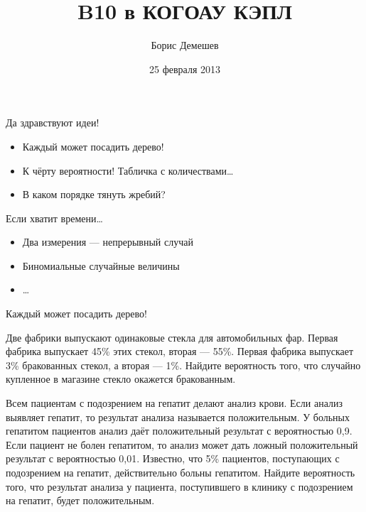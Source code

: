 \documentclass[pdftex,unicode]{beamer}
\title{B10 в КОГОАУ КЭПЛ}
\author[\href{mailto:boris.demeshev@gmail.com}{boris.demeshev@gmail.com}]{Борис Демешев}
\date{25 февраля 2013}
\institute{НИУ ВШЭ}
\begin{document}
\begin{frame}[plain]
\maketitle %
\end{frame}


\begin{frame}{} %

\begin{block}{Да здравствуют идеи!}

\begin{itemize}
\item Каждый может посадить дерево!
\item К чёрту вероятности! Табличка с количествами\ldots
\item В каком порядке тянуть жребий?
\end{itemize}

\end{block}

\begin{block}{Если хватит времени\ldots}
\begin{itemize}
\item Два измерения --- непрерывный случай
\item Биномиальные случайные величины
\item \ldots
\end{itemize}
\end{block}

\end{frame}




\begin{frame}{Каждый может посадить дерево!}

\begin{block}{}
Две фабрики выпускают одинаковые стекла для автомобильных фар. Первая фабрика выпускает 45\% этих стекол, вторая --- 55\%. Первая фабрика выпускает 3\% бракованных стекол, а вторая --- 1\%. Найдите вероятность того, что случайно купленное в магазине стекло окажется бракованным.
\end{block}

\begin{block}{}
Всем пациентам с подозрением на гепатит делают анализ крови. Если анализ выявляет гепатит, то результат анализа называется положительным. У больных гепатитом пациентов анализ даёт положительный результат с вероятностью 0,9. Если пациент не болен гепатитом, то анализ может дать ложный положительный результат с вероятностью 0,01. Известно, что 5\% пациентов, поступающих с подозрением на гепатит, действительно больны гепатитом. Найдите вероятность того, что результат анализа у пациента, поступившего в клинику с подозрением на гепатит, будет положительным.
\end{block}

\end{frame}
\end{document}
